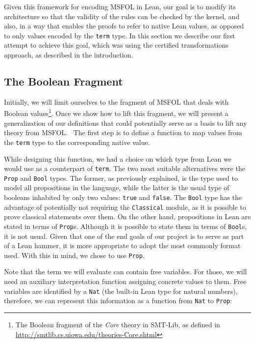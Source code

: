 Given this framework for encoding MSFOL in Lean, our goal is to
modify its architecture so that the validity of the rules can be
checked by the kernel, and also, in a way that enables the proofs to refer
to native Lean values, as opposed to only values encoded by the
\texttt{term} type. In this section we describe our first attempt
to achieve this goal, which was using the certified transformations
approach, as described in the introduction.

\subsection{The Boolean Fragment}

Initially, we will limit ourselves to the fragment of MSFOL that
deals with Boolean values\footnote{The Boolean fragment of the
\emph{Core} theory in SMT-Lib, as defined in
\url{http://smtlib.cs.uiowa.edu/theories-Core.shtml}}. Once
we show how to lift this fragment, we will present a generalization
of our definitions that could potentially serve as a basis to lift
any theory from MSFOL.\
%
The first step is to define a function to map values from the \texttt{term} type
to the corresponding native value.

While designing this function, we had a
choice on which type from Lean we would use as a counterpart of \texttt{term}. The two
most suitable alternatives were the \texttt{Prop} and \texttt{Bool} types. The former, as
previously explained, is the type used to model all propositions in the language, while
the latter is the usual type of booleans inhabited by only two values: \texttt{true} and
\texttt{false}. The \texttt{Bool} type has the advantage of potentially not requiring the
\texttt{Classical} module, as it is possible to prove classical statements over them. On
the other hand, propositions in Lean are stated in terms of \texttt{Prop}s.
\tom{I'm not sure about the next statement} Although it is
possible to state them in terms of \texttt{Bool}s, it is not usual. Given that one of the
end goals of our project is to serve as part of a Lean hammer, it is more appropriate
to adopt the most commonly format used. With this in mind, we chose to use \texttt{Prop}.


Note that the term we will evaluate can contain free variables. For those, we will need an auxiliary interpretation function assigning concrete values to them.
Free variables are
identified by a \texttt{Nat} (the built-in Lean type for natural numbers), therefore, we can
represent this information as a function from \texttt{Nat} to
\texttt{Prop}:

